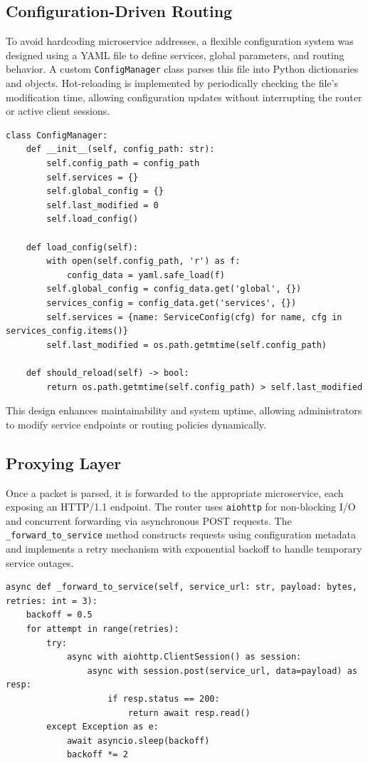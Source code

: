 \subsection{Configuration-Driven Routing}
To avoid hardcoding microservice addresses, a flexible configuration system was designed using a YAML file to define services, global parameters, and routing behavior. A custom \texttt{ConfigManager} class parses this file into Python dictionaries and objects. Hot-reloading is implemented by periodically checking the file’s modification time, allowing configuration updates without interrupting the router or active client sessions.

\begin{lstlisting}
class ConfigManager:
    def __init__(self, config_path: str):
        self.config_path = config_path
        self.services = {}
        self.global_config = {}
        self.last_modified = 0
        self.load_config()

    def load_config(self):
        with open(self.config_path, 'r') as f:
            config_data = yaml.safe_load(f)
        self.global_config = config_data.get('global', {})
        services_config = config_data.get('services', {})
        self.services = {name: ServiceConfig(cfg) for name, cfg in services_config.items()}
        self.last_modified = os.path.getmtime(self.config_path)

    def should_reload(self) -> bool:
        return os.path.getmtime(self.config_path) > self.last_modified
\end{lstlisting}

This design enhances maintainability and system uptime, allowing administrators to modify service endpoints or routing policies dynamically.

\subsection{Proxying Layer}
Once a packet is parsed, it is forwarded to the appropriate microservice, each exposing an HTTP/1.1 endpoint. The router uses \texttt{aiohttp} for non-blocking I/O and concurrent forwarding via asynchronous POST requests. The \texttt{\_forward\_to\_service} method constructs requests using configuration metadata and implements a retry mechanism with exponential backoff to handle temporary service outages.

\begin{lstlisting}
async def _forward_to_service(self, service_url: str, payload: bytes, retries: int = 3):
    backoff = 0.5
    for attempt in range(retries):
        try:
            async with aiohttp.ClientSession() as session:
                async with session.post(service_url, data=payload) as resp:
                    if resp.status == 200:
                        return await resp.read()
        except Exception as e:
            await asyncio.sleep(backoff)
            backoff *= 2
\end{lstlisting}

